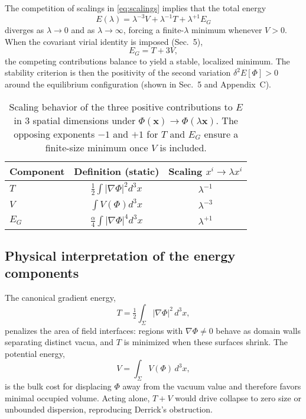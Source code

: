 \documentclass{article}
\begin{document}
The competition of scalings in \eqref{eq:scalings} implies that the total energy
\begin{equation}
E(\lambda) = \lambda^{-3}V + \lambda^{-1}T + \lambda^{+1}E_G
\label{eq:E_lambda}
\end{equation}
diverges as $\lambda\!\to\!0$ and as $\lambda\!\to\!\infty$, forcing a finite-$\lambda$ minimum whenever $V>0$. When the covariant virial identity is imposed (Sec.~5),
\begin{equation}
E_G = T + 3V,
\label{eq:virial_balance}
\end{equation}
the competing contributions balance to yield a stable, localized minimum. The stability criterion is then the positivity of the second variation $\delta^2 E[\Phi]>0$ around the equilibrium configuration (shown in Sec.~5 and Appendix~C).

\begin{table}[t]
\centering
\caption{Scaling behavior of the three positive contributions to $E$ in $3$ spatial dimensions under $\Phi(\mathbf{x})\!\to\!\Phi(\lambda\mathbf{x})$. The opposing exponents $-1$ and $+1$ for $T$ and $E_G$ ensure a finite-size minimum once $V$ is included.}
\label{tab:scaling}
\begin{tabular}{lcc}
\hline\hline
Component & Definition (static) & Scaling $x^i\!\to\!\lambda x^i$ \\
\hline
$T$ & $\tfrac12\!\int |\nabla\Phi|^2 d^3x$ & $\lambda^{-1}$ \\
$V$ & $\int V(\Phi) d^3x$ & $\lambda^{-3}$ \\
$E_G$ & $\tfrac{\alpha}{4}\!\int |\nabla\Phi|^4 d^3x$ & $\lambda^{+1}$ \\
\hline\hline
\end{tabular}
\end{table}

\subsection{Physical interpretation of the energy components}
\label{subsec:phys_components}

The canonical gradient energy,
\begin{equation}
T = \tfrac12\int_{\Sigma} |\nabla\Phi|^2\, d^3x ,
\label{eq:T_energy_def}
\end{equation}
penalizes the area of field interfaces: regions with $\nabla\Phi\neq0$ behave as domain walls separating distinct vacua, and $T$ is minimized when these surfaces shrink. The potential energy,
\begin{equation}
V = \int_{\Sigma} V(\Phi)\, d^3x ,
\label{eq:V_energy_def}
\end{equation}
is the bulk cost for displacing $\Phi$ away from the vacuum value and therefore favors minimal occupied volume. Acting alone, $T+V$ would drive collapse to zero size or unbounded dispersion, reproducing Derrick’s obstruction.
\end{document}
